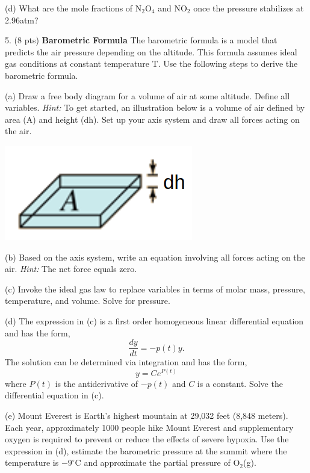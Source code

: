 \documentclass[11pt]{article}
\begin{document}
(d) What are the mole fractions of N$_2$O$_4$ and NO$_2$ once the pressure stabilizes at
2.96atm?

\pagebreak

5. (8 pts) \textbf{Barometric Formula} The barometric formula is a model that predicts the
air pressure depending on the altitude. This formula assumes ideal gas conditions at constant
temperature T. Use the following steps to derive the barometric formula.

(a) Draw a free body diagram for a volume of air at some altitude. Define all variables. \textit{Hint:}
To get started, an illustration below is a volume of air defined by area (A) and height (dh).
Set up your axis system and draw all forces acting on the air.
\begin{center}
  \includegraphics[scale=0.3]{air_vol.png}
\end{center}

(b) Based on the axis system, write an equation involving all forces acting on the air.
\textit{Hint:} The net force equals zero.

(c) Invoke the ideal gas law to replace variables in terms of molar mass, pressure,
temperature, and volume. Solve for pressure.

(d) The expression in (c) is a first order homogeneous linear differential equation and
has the form,
\begin{equation}
  \frac{dy}{dt} = -p(t)y.
\end{equation}
The solution can be determined via integration and has the form,
\begin{equation}
  y = Ce^{P(t)}
\end{equation}
where $P(t)$ is the antiderivative of $-p(t)$ and $C$ is a constant. Solve the differential
equation in (c).

(e) Mount Everest is Earth's highest mountain at 29,032 feet (8,848 meters). Each year,
approximately 1000 people hike Mount Everest and supplementary oxygen is required to
prevent or reduce the effects of severe hypoxia. Use the expression in (d), estimate the
barometric pressure at the summit where the temperature is $-9^\circ\text{C}$ and approximate
the partial pressure of O$_2$(g).
\end{document}
